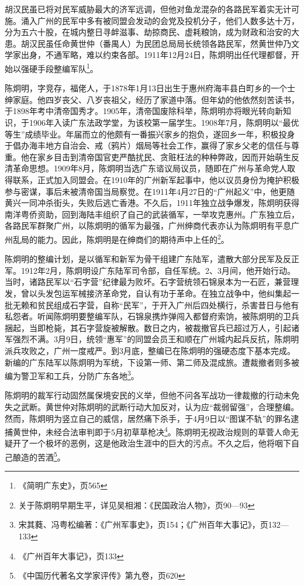 胡汉民虽已将对民军威胁最大的济军远调，但他对鱼龙混杂的各路民军着实无计可施。涌入广州的民军中多有被同盟会发动的会党及投机分子，他们人数多达十万，分为五六十股，在城内整日寻衅滋事、劫掠商民、虚耗粮饷，成为财政和治安的大患。胡汉民虽任命黄世仲（番禺人）为民团总局局长统领各路民军，然黄世仲乃文学家出身，不通军略，难以约束各部。1911年12月24日，陈炯明出任代理都督，开始以强硬手段整编军队\footnote{《简明广东史》，页565}。

陈炯明，字竞存，福佬人，于1878年1月13日出生于惠州府海丰县白町乡的一个士绅家庭。他四岁丧父、八岁丧祖父，经历了家道中落。但年幼的他依然刻苦读书，于1898年考中清帝国秀才。1905年，清帝国废除科举，陈炯明亦将眼光转向新知识，于1906年入读广东法政学堂，为该校第一届学生。1908年7月，陈炯明以“最优等生”成绩毕业。年届而立的他颇有一番振兴家乡的抱负，遂回乡一年，积极投身于倡办海丰地方自治会、戒（鸦片）烟局等社会工作，赢得了家乡父老的信任与尊重。他在家乡目击到清帝国官吏严酷扰民、贪赃枉法的种种弊政，因而开始萌生反清革命思想。1909年8月，陈炯明当选广东谘议局议员，随即在广州与革命党人取得联系，正式加入同盟会。在1910年的广州新军起事中，他以议员身份为掩护积极参与密谋，事后未被清帝国当局察觉。在1911年4月27日的“广州起义”中，他更随黄兴一同冲杀街头，失败后逃亡香港。不久后，1911年独立战争爆发，陈炯明获得南洋粤侨资助，回到海陆丰组织了自己的武装循军，一举攻克惠州。广东独立后，各路民军群聚广州，以陈炯明的循军为最强，广州绅商代表亦认为陈炯明有平息广州乱局的能力。因此，陈炯明是在绅商们的期待声中上任的\footnote{关于陈炯明早期生平，详见吴相湘：《民国政治人物》，页90—93}。

陈炯明的整编计划，是以循军和新军为骨干组建广东陆军，遣散大部分民军及反正军。1912年2月，陈炯明设广东陆军司令部，自任军统。2、3月间，他开始行动。当时，诸路民军以“石字营”纪律最为败坏。石字营统领石锦泉本为一石匠，兼营理发，曾以头发包运军械接济革命党，自认有功于革命。在独立战争中，他纠集起一批无赖和贫民组成石字营，自称“民军”，于开入广州后四处横行，杀害昔日与他有私怨者。听闻陈炯明要整编军队，石锦泉携炸弹闯入都督府索饷，被陈炯明的卫兵捆起，当即枪毙，其石字营旋被解散。数日之内，被裁撤官兵已超过万人，引起诸军强烈不满。3月9日，统领“惠军”的同盟会员王和顺在广州城内起兵反抗，陈炯明派兵攻败之，广州一度戒严。到3月底，整编已在陈炯明的强硬态度下基本完成。新编的广东陆军以陈炯明为军统，下设第一师、第二师及混成旅。遭裁撤者则多被编为警卫军和工兵，分防广东各地\footnote{宋其蕤、冯粤松编著：《广州军事史》，页154；《广州百年大事记》，页132—133}。

陈炯明的裁军行动固然属保境安民的义举，但他不问各军战功一律裁撤的行动未免失之武断。黄世仲对陈炯明的武断行动大加反对，认为应“裁弱留强”，合理整编。然而，陈炯明为竖立自己的威信，居然痛下杀手，于4月9日以“图谋不轨”的罪名逮捕黄世仲，未经合法审判即于5月初草草枪决\footnote{《广州百年大事记》，页133}。陈炯明无视政治规则的草菅人命无疑开了一个极坏的恶例，这是他政治生涯中的巨大的污点。不久之后，他将咽下自己酿造的苦酒\footnote{《中国历代著名文学家评传》第九卷，页620}。

